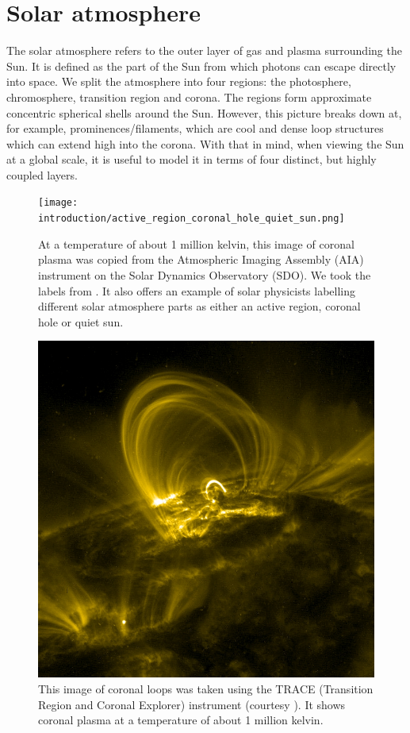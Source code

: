 \section{Solar atmosphere}
\label{sec:solar_atmosphere}

The solar atmosphere refers to the outer layer of gas and plasma surrounding the Sun. It is defined as the part of the Sun from which photons can escape directly into space. We split the atmosphere into four regions: the photosphere, chromosphere, transition region and corona. The regions form approximate concentric spherical shells around the Sun. However, this picture breaks down at, for example, prominences/filaments, which are cool and dense loop structures which can extend high into the corona. With that in mind, when viewing the Sun at a global scale, it is useful to model it in terms of four distinct, but highly coupled layers.

\begin{figure}[!htp]
    \centering
    \texttt{[image: introduction/active\_region\_coronal\_hole\_quiet\_sun.png]}
    \caption{At a temperature of about 1 million kelvin, this image of coronal plasma was copied from the Atmospheric Imaging Assembly (AIA) instrument on the Solar Dynamics Observatory (SDO). We took the labels from \citet{Cargill2011}. It also offers an example of solar physicists labelling different solar atmosphere parts as either an active region, coronal hole or quiet sun.}
    \label{fig:active_region_quiet_sun_coronal_hole}
\end{figure}

\begin{figure}[!htp]
    \centering
    \includegraphics[width=\textwidth]{figures/introduction/coronal_loop_trace.jpg}
    \caption{This image of coronal loops was taken using the TRACE (Transition Region and Coronal Explorer) instrument (courtesy \citet{images_of_coronal_loops}). It shows coronal plasma at a temperature of about 1 million kelvin.}
    \label{fig:coronal_loops_trace}
\end{figure}


